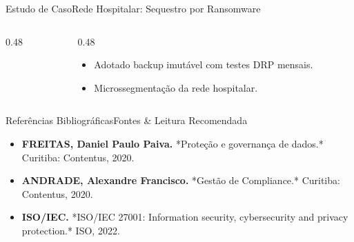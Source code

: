 \begin{senaiframe}{Estudo de Caso}{Rede Hospitalar: Sequestro por Ransomware}
  \begin{columns}[t]
    \begin{column}{0.48\textwidth}
      \begin{tcolorbox}[senairedcard, title={Incidente Real}]
      \end{tcolorbox}
    \end{column}
    \begin{column}{0.48\textwidth}
      \begin{tcolorbox}[senaigreencard, title={Resposta de Governança}]
        \begin{itemize}
          \item Adotado backup imutável com testes DRP mensais.
          \item Microssegmentação da rede hospitalar.
        \end{itemize}
      \end{tcolorbox}
    \end{column}
  \end{columns}
\end{senaiframe}

\begin{senaiframe}{Referências Bibliográficas}{Fontes \& Leitura Recomendada}
  \begin{tcolorbox}[senaicard, title={Obras de Referência}]
    \begin{itemize}
      \item \textbf{FREITAS, Daniel Paulo Paiva.} *Proteção e governança de dados.* Curitiba: Contentus, 2020.
      \item \textbf{ANDRADE, Alexandre Francisco.} *Gestão de Compliance.* Curitiba: Contentus, 2020.
      \item \textbf{ISO/IEC.} *ISO/IEC 27001: Information security, cybersecurity and privacy protection.* ISO, 2022.
    \end{itemize}
  \end{tcolorbox}
\end{senaiframe}

